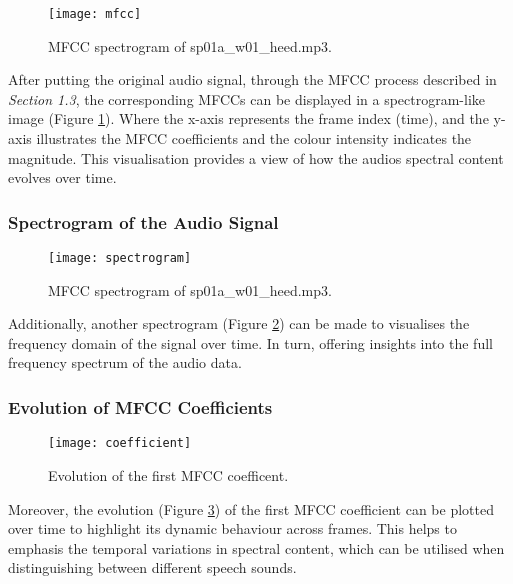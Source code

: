 \documentclass{article}
\begin{document}
\begin{figure}[!h]
\begin{center}
\texttt{[image: mfcc]}
\end{center}
\caption{\label{fig:mfcc} MFCC spectrogram of sp01a\_w01\_heed.mp3.}
\end{figure}

After putting the original audio signal, through the MFCC process described in \textit{Section 1.3}, the corresponding MFCCs can be displayed in a spectrogram-like image (Figure \ref{fig:mfcc}). Where the x-axis represents the frame index (time), and the y-axis illustrates the MFCC coefficients and the colour intensity indicates the magnitude. This visualisation provides a view of how the audios spectral content evolves over time.


\subsubsection{Spectrogram of the Audio Signal}

\begin{figure}[!h]
\begin{center}
\texttt{[image: spectrogram]}
\end{center}
\caption{\label{fig:spectrogram} MFCC spectrogram of sp01a\_w01\_heed.mp3.}
\end{figure}

Additionally, another spectrogram (Figure \ref{fig:spectrogram}) can be made to visualises the frequency domain of the signal over time. In turn, offering insights into the full frequency spectrum of the audio data.


\subsubsection{Evolution of MFCC Coefficients}

\begin{figure}[!h]
\begin{center}
\texttt{[image: coefficient]}
\end{center}
\caption{\label{fig:coefficient} Evolution of the first MFCC coefficent.}
\end{figure}

Moreover, the evolution (Figure \ref{fig:coefficient}) of the first MFCC coefficient can be plotted over time to highlight its dynamic behaviour across frames. This helps to emphasis the temporal variations in spectral content, which can be utilised when distinguishing between different speech sounds.
\end{document}
